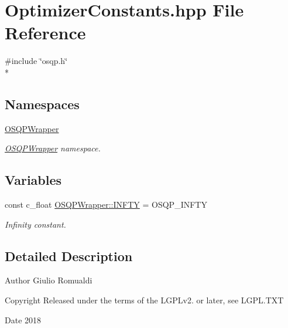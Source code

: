 \section{Optimizer\+Constants.\+hpp File Reference}
\label{OptimizerConstants_8hpp}
{\ttfamily \#include \char`\"{}osqp.\+h\char`\"{}}\\*
\subsection*{Namespaces}
\begin{DoxyCompactItemize}
\item 
 \hyperlink{namespaceOSQPWrapper}{O\+S\+Q\+P\+Wrapper}
\begin{DoxyCompactList}\small\item\em \hyperlink{namespaceOSQPWrapper}{O\+S\+Q\+P\+Wrapper} namespace. \end{DoxyCompactList}\end{DoxyCompactItemize}
\subsection*{Variables}
\begin{DoxyCompactItemize}
\item 
const c\+\_\+float \hyperlink{namespaceOSQPWrapper_acd019994292e24a05996343e62593de6}{O\+S\+Q\+P\+Wrapper\+::\+I\+N\+F\+TY} = O\+S\+Q\+P\+\_\+\+I\+N\+F\+TY
\begin{DoxyCompactList}\small\item\em Infinity constant. \end{DoxyCompactList}\end{DoxyCompactItemize}


\subsection{Detailed Description}
\begin{DoxyAuthor}{Author}
Giulio Romualdi 
\end{DoxyAuthor}
\begin{DoxyCopyright}{Copyright}
Released under the terms of the L\+G\+P\+Lv2. or later, see L\+G\+P\+L.\+T\+XT 
\end{DoxyCopyright}
\begin{DoxyDate}{Date}
2018 
\end{DoxyDate}
